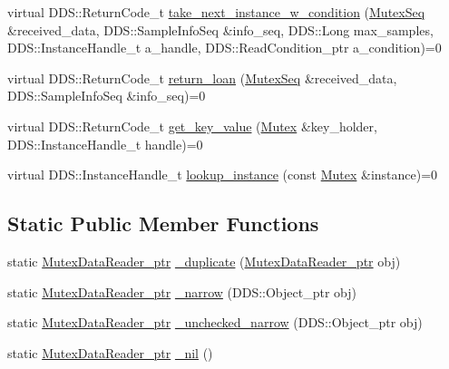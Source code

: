 \begin{DoxyCompactItemize}
\item 
virtual DDS::ReturnCode\_\-t \hyperlink{classKnowledge_1_1MutexDataReader_a792452aed491d03693de6cf05fb2b8a4}{take\_\-next\_\-instance\_\-w\_\-condition} (\hyperlink{namespaceKnowledge_a3165529aa87299c6a92754fbd7eeeff4}{MutexSeq} \&received\_\-data, DDS::SampleInfoSeq \&info\_\-seq, DDS::Long max\_\-samples, DDS::InstanceHandle\_\-t a\_\-handle, DDS::ReadCondition\_\-ptr a\_\-condition)=0
\item 
virtual DDS::ReturnCode\_\-t \hyperlink{classKnowledge_1_1MutexDataReader_ac0617c4f7a2900b94467aceba86506b7}{return\_\-loan} (\hyperlink{namespaceKnowledge_a3165529aa87299c6a92754fbd7eeeff4}{MutexSeq} \&received\_\-data, DDS::SampleInfoSeq \&info\_\-seq)=0
\item 
virtual DDS::ReturnCode\_\-t \hyperlink{classKnowledge_1_1MutexDataReader_a31f04584b9848d0d8590689274a42a51}{get\_\-key\_\-value} (\hyperlink{structKnowledge_1_1Mutex}{Mutex} \&key\_\-holder, DDS::InstanceHandle\_\-t handle)=0
\item 
virtual DDS::InstanceHandle\_\-t \hyperlink{classKnowledge_1_1MutexDataReader_ab960d3a134b1ab63d826ea2f2b5b633f}{lookup\_\-instance} (const \hyperlink{structKnowledge_1_1Mutex}{Mutex} \&instance)=0
\end{DoxyCompactItemize}
\subsection*{Static Public Member Functions}
\begin{DoxyCompactItemize}
\item 
static \hyperlink{classKnowledge_1_1MutexDataReader}{MutexDataReader\_\-ptr} \hyperlink{classKnowledge_1_1MutexDataReader_a4eb89e71c4d18a237fcbce2da771d858}{\_\-duplicate} (\hyperlink{classKnowledge_1_1MutexDataReader}{MutexDataReader\_\-ptr} obj)
\item 
static \hyperlink{classKnowledge_1_1MutexDataReader}{MutexDataReader\_\-ptr} \hyperlink{classKnowledge_1_1MutexDataReader_a82be4e0b8d228a5761f27884790130a3}{\_\-narrow} (DDS::Object\_\-ptr obj)
\item 
static \hyperlink{classKnowledge_1_1MutexDataReader}{MutexDataReader\_\-ptr} \hyperlink{classKnowledge_1_1MutexDataReader_a20cd26e7654e33c8920b26875ffbadf8}{\_\-unchecked\_\-narrow} (DDS::Object\_\-ptr obj)
\item 
static \hyperlink{classKnowledge_1_1MutexDataReader}{MutexDataReader\_\-ptr} \hyperlink{classKnowledge_1_1MutexDataReader_ab3c680bc87572213eb934e98b6986ab8}{\_\-nil} ()
\end{DoxyCompactItemize}
